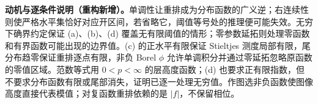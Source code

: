 \documentclass[../../main.tex]{subfiles}
\begin{document}
\begin{remark}
\textbf{动机与逐条件说明（重构新增）。}单调性让重排成为分布函数的广义逆；右连续性则使严格水平集恰好对应开区间，若省略它，阈值等号处的推理便可能失效。无穷下确界约定保证 (a)、(b)、(d) 覆盖无有限阈值的情形；零参数延拓则处理零函数和有界函数可能出现的边界值。(c) 的正水平有限保证 Stieltjes 测度局部有限，尾分布趋零保证重排逐点有限，非负 Borel $\phi$ 允许单调积分并通过零延拓忽略原函数的零值区域。范数等式用 $0<p<\infty$ 的层高度函数；(d) 也要求正有限指数，但不要求分布函数有限或尾部消失，证明已逐一处理无穷值。作图选非负函数使图像高度直接代表模值；对复函数重排依赖的是 $|f|$，不保留相位。
\end{remark}
\end{document}
